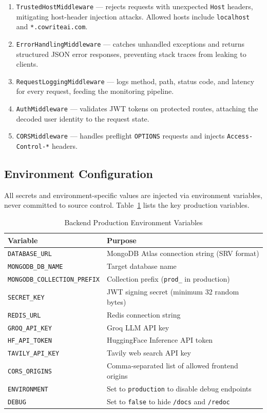 \begin{enumerate}
    \item \texttt{TrustedHostMiddleware} — rejects requests with unexpected \texttt{Host} headers, mitigating host-header injection attacks. Allowed hosts include \texttt{localhost} and \texttt{*.cowriteai.com}.
    \item \texttt{ErrorHandlingMiddleware} — catches unhandled exceptions and returns structured JSON error responses, preventing stack traces from leaking to clients.
    \item \texttt{RequestLoggingMiddleware} — logs method, path, status code, and latency for every request, feeding the monitoring pipeline.
    \item \texttt{AuthMiddleware} — validates JWT tokens on protected routes, attaching the decoded user identity to the request state.
    \item \texttt{CORSMiddleware} — handles preflight \texttt{OPTIONS} requests and injects \texttt{Access-Control-*} headers.
\end{enumerate}

\subsection{Environment Configuration}

All secrets and environment-specific values are injected via environment variables, never committed to source control. Table~\ref{tab:backend-env} lists the key production variables.

\begin{table}[H]
\centering
\begin{tabular}{|p{5cm}|p{8.5cm}|}
\hline
\textbf{Variable} & \textbf{Purpose} \\
\hline
\texttt{DATABASE\_URL} & MongoDB Atlas connection string (SRV format) \\
\hline
\texttt{MONGODB\_DB\_NAME} & Target database name \\
\hline
\texttt{MONGODB\_COLLECTION\_PREFIX} & Collection prefix (\texttt{prod\_} in production) \\
\hline
\texttt{SECRET\_KEY} & JWT signing secret (minimum 32 random bytes) \\
\hline
\texttt{REDIS\_URL} & Redis connection string \\
\hline
\texttt{GROQ\_API\_KEY} & Groq LLM API key \\
\hline
\texttt{HF\_API\_TOKEN} & HuggingFace Inference API token \\
\hline
\texttt{TAVILY\_API\_KEY} & Tavily web search API key \\
\hline
\texttt{CORS\_ORIGINS} & Comma-separated list of allowed frontend origins \\
\hline
\texttt{ENVIRONMENT} & Set to \texttt{production} to disable debug endpoints \\
\hline
\texttt{DEBUG} & Set to \texttt{false} to hide \texttt{/docs} and \texttt{/redoc} \\
\hline
\end{tabular}
\caption{Backend Production Environment Variables}
\label{tab:backend-env}
\end{table}

